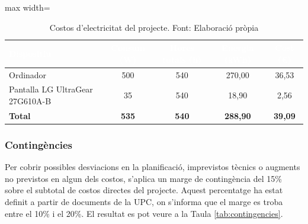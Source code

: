 \documentclass[11pt,a4paper]{report}
\begin{document}
\begin{table}[H]
    \centering
    \small
    \renewcommand{\arraystretch}{2}
    \begin{adjustbox}{max width=\textwidth}
    \begin{tabular}{|l|c|c|c|c|}
        \hline
        \rowcolor{oceanblue}
        \textcolor{white}{\textbf{Dispositiu}} &
        \textcolor{white}{\textbf{Consum (W)}} &
        \textcolor{white}{\textbf{Hores totals (h)}} &
        \textcolor{white}{\textbf{Energia (kWh)}} &
        \textcolor{white}{\textbf{Cost (€)}} \\
        \hline
        Ordinador                       & 500 & 540 & 270,00 & 36,53 \\
        \hline
        Pantalla LG UltraGear 27G610A-B &  35 & 540 &  18,90 &  2,56 \\
        \hline
        \rowcolor{gray!20}
        \textbf{Total} & \textbf{535} & \textbf{540} & \textbf{288,90} & \textbf{39,09} \\
        \hline
    \end{tabular}
    \end{adjustbox}
    \caption[Costos d'electricitat]{Costos d'electricitat del projecte. Font: Elaboració pròpia}
    \label{tab:electricitat}
\end{table}

\subsubsection{Contingències}

Per cobrir possibles desviacions en la planificació, imprevistos tècnics o 
augments no previstos en algun dels costos, s'aplica un marge de contingència 
del 15\% sobre el subtotal de costos directes del projecte. Aquest percentatge ha estat definit a partir de documents de la UPC, on s'informa que el marge es troba entre el 10\% i el 20\%. El resultat es pot veure a la Taula \ref{tab:contingencies}.
\end{document}
